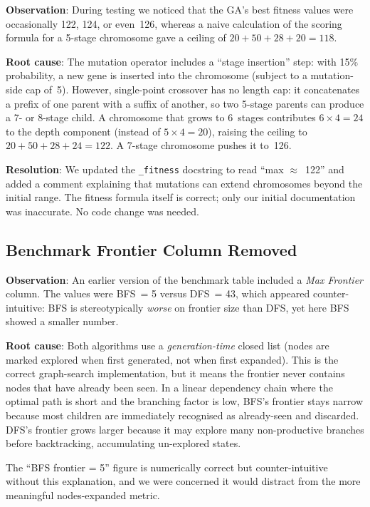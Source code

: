 \documentclass[12pt, a4paper]{report}
\begin{document}
\textbf{Observation}: During testing we noticed that the GA's best fitness
values were occasionally 122, 124, or even~126, whereas a naive calculation of
the scoring formula for a 5-stage chromosome gave a ceiling of
$20 + 50 + 28 + 20 = 118$.

\textbf{Root cause}: The mutation operator includes a ``stage insertion'' step:
with 15\% probability, a new gene is inserted into the chromosome (subject to a
mutation-side cap of~5).  However, single-point crossover has no length cap: it
concatenates a prefix of one parent with a suffix of another, so two 5-stage parents
can produce a 7- or 8-stage child.  A chromosome that grows to 6~stages
contributes $6 \times 4 = 24$ to the depth component (instead of
$5 \times 4 = 20$), raising the ceiling to
$20 + 50 + 28 + 24 = 122$.  A 7-stage chromosome pushes it to~126.

\textbf{Resolution}: We updated the \texttt{\_fitness} docstring to read ``max
$\approx$~122'' and added a comment explaining that mutations can extend
chromosomes beyond the initial range.  The fitness formula itself is correct;
only our initial documentation was inaccurate.  No code change was needed.

\subsection{Benchmark Frontier Column Removed}

\textbf{Observation}: An earlier version of the benchmark table included a
\textit{Max Frontier} column.  The values were BFS~= 5 versus DFS~= 43, which
appeared counter-intuitive: BFS is stereotypically \emph{worse} on frontier
size than DFS, yet here BFS showed a smaller number.

\textbf{Root cause}: Both algorithms use a \emph{generation-time} closed list
(nodes are marked explored when first generated, not when first expanded).
This is the correct graph-search implementation, but it means the frontier
never contains nodes that have already been seen.  In a linear dependency chain
where the optimal path is short and the branching factor is low, BFS's frontier
stays narrow because most children are immediately recognised as already-seen
and discarded.  DFS's frontier grows larger because it may explore many
non-productive branches before backtracking, accumulating un-explored states.

The ``BFS frontier = 5'' figure is numerically correct but counter-intuitive
without this explanation, and we were concerned it would distract from the more
meaningful nodes-expanded metric.
\end{document}

